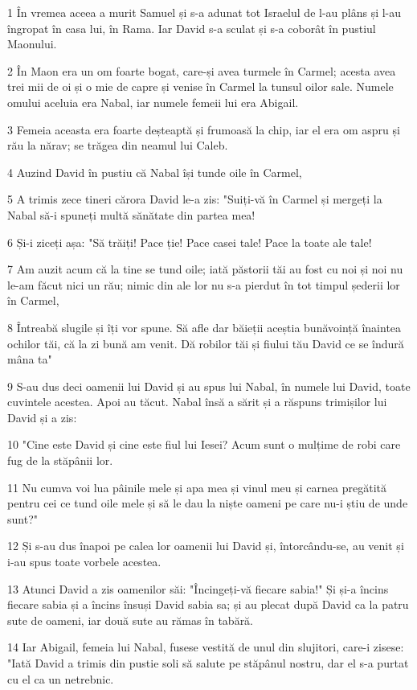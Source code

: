 \par 1 În vremea aceea a murit Samuel și s-a adunat tot Israelul de l-au plâns și l-au îngropat în casa lui, în Rama. Iar David s-a sculat și s-a coborât în pustiul Maonului.
\par 2 În Maon era un om foarte bogat, care-și avea turmele în Carmel; acesta avea trei mii de oi și o mie de capre și venise în Carmel la tunsul oilor sale. Numele omului aceluia era Nabal, iar numele femeii lui era Abigail.
\par 3 Femeia aceasta era foarte deșteaptă și frumoasă la chip, iar el era om aspru și rău la nărav; se trăgea din neamul lui Caleb.
\par 4 Auzind David în pustiu că Nabal își tunde oile în Carmel,
\par 5 A trimis zece tineri cărora David le-a zis: "Suiți-vă în Carmel și mergeți la Nabal să-i spuneți multă sănătate din partea mea!
\par 6 Și-i ziceți așa: "Să trăiți! Pace ție! Pace casei tale! Pace la toate ale tale!
\par 7 Am auzit acum că la tine se tund oile; iată păstorii tăi au fost cu noi și noi nu le-am făcut nici un rău; nimic din ale lor nu s-a pierdut în tot timpul șederii lor în Carmel,
\par 8 Întreabă slugile și îți vor spune. Să afle dar băieții aceștia bunăvoință înaintea ochilor tăi, că la zi bună am venit. Dă robilor tăi și fiului tău David ce se îndură mâna ta"
\par 9 S-au dus deci oamenii lui David și au spus lui Nabal, în numele lui David, toate cuvintele acestea. Apoi au tăcut. Nabal însă a sărit și a răspuns trimișilor lui David și a zis:
\par 10 "Cine este David și cine este fiul lui Iesei? Acum sunt o mulțime de robi care fug de la stăpânii lor.
\par 11 Nu cumva voi lua pâinile mele și apa mea și vinul meu și carnea pregătită pentru cei ce tund oile mele și să le dau la niște oameni pe care nu-i știu de unde sunt?"
\par 12 Și s-au dus înapoi pe calea lor oamenii lui David și, întorcându-se, au venit și i-au spus toate vorbele acestea.
\par 13 Atunci David a zis oamenilor săi: "Încingeți-vă fiecare sabia!" Și și-a încins fiecare sabia și a încins însuși David sabia sa; și au plecat după David ca la patru sute de oameni, iar două sute au rămas în tabără.
\par 14 Iar Abigail, femeia lui Nabal, fusese vestită de unul din slujitori, care-i zisese: "Iată David a trimis din pustie soli să salute pe stăpânul nostru, dar el s-a purtat cu el ca un netrebnic.
